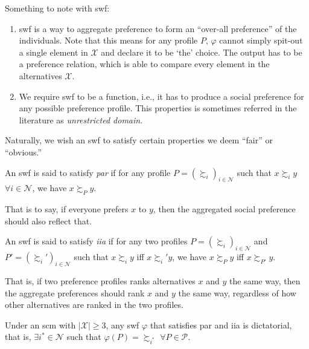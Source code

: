 \documentclass[a4paper]{article}
\begin{document}
\begin{multicols}{2}
\begin{remark}
	Something to note with \gls*{swf}:
	\begin{enumerate}
		\item
			\gls*{swf} is a way to aggregate preference to form an ``over-all preference'' of the individuals.
			Note that this means for any profile $P$,
			$\varphi$ cannot simply spit-out a single element in $\mathcal{X}$ and declare it to be `the' choice.
			The output has to be a preference relation,
			which is able to compare every element in the alternatives $\mathcal{X}$.
		\item
			We require \gls*{swf} to be a function,
			i.e., it has to produce a social preference for any possible preference profile.
			This properties is sometimes referred in the literature as \emph{unrestricted domain}.
	\end{enumerate}
	Naturally, we wish an \gls*{swf} to satisfy certain properties we deem ``fair'' or ``obvious.''
\end{remark}

\begin{axiom}
	An \gls*{swf} is said to satisfy \emph{\gls*{par}}
	if for any profile $P=(\succsim_i)_{i\in\mathcal{N}}$ such that $x\succsim_i y$ $\forall i\in\mathcal{N}$,
	we have $x\succsim_{P} y$.
\end{axiom}

\begin{remark}
	That is to say, if everyone prefers $x$ to $y$,
	then the aggregated social preference should also reflect that.
\end{remark}

\begin{axiom}
	An \gls*{swf} is said to satisfy \emph{\gls*{iia}}
	if for any two profiles $P=(\succsim_i)_{i\in\mathcal{N}}$ and $P'=(\succsim_i')_{i\in\mathcal{N}}$
	such that $x\succsim_i y$ iff $x\succsim_i' y$,
	we have $x\succsim_P y$ iff $x\succsim_{P'}y$.
\end{axiom}

\begin{remark}
	That is, if two preference profiles ranks alternatives $x$ and $y$ the same way,
	then the aggregate preferences should rank $x$ and $y$ the same way,
	regardless of how other alternatives are ranked in the two profiles.
\end{remark}

\begin{theorem}
	Under an \gls*{scm} with $|\mathcal{X}|\geq3$,
	any \gls*{swf} $\varphi$ that satisfies \gls*{par} and \gls*{iia} is dictatorial,
	that is, $\exists i^*\in\mathcal{N}$ such that $\varphi(P)=\mathord{\succsim_{i^*}}$ $\forall P\in\mathcal{P}$.
\end{theorem}


\end{multicols}
\end{document}
